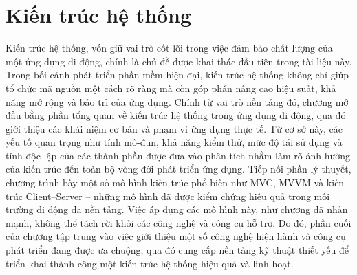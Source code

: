 
\chapter{Kiến trúc hệ thống}
\label{chap:Chap1}
\vspace{-0.8em}
\hspace*{0.8cm}Kiến trúc hệ thống, vốn giữ vai trò cốt lõi trong việc đảm bảo chất lượng của một ứng dụng di động, chính là chủ đề được khai thác đầu tiên trong tài liệu này. Trong bối cảnh phát triển phần mềm hiện đại, kiến trúc hệ thống không chỉ giúp tổ chức mã nguồn một cách rõ ràng mà còn góp phần nâng cao hiệu suất, khả năng mở rộng và bảo trì của ứng dụng. Chính từ vai trò nền tảng đó, chương mở đầu bằng phần tổng quan về kiến trúc hệ thống trong ứng dụng di động, qua đó giới thiệu các khái niệm cơ bản và phạm vi ứng dụng thực tế. Từ cơ sở này, các yếu tố quan trọng như tính mô-đun, khả năng kiểm thử, mức độ tái sử dụng và tính độc lập của các thành phần được đưa vào phân tích nhằm làm rõ ảnh hưởng của kiến trúc đến toàn bộ vòng đời phát triển ứng dụng. Tiếp nối phần lý thuyết, chương trình bày một số mô hình kiến trúc phổ biến như MVC, MVVM và kiến trúc Client–Server – những mô hình đã được kiểm chứng hiệu quả trong môi trường di động đa nền tảng. Việc áp dụng các mô hình này, như chương đã nhấn mạnh, không thể tách rời khỏi các công nghệ và công cụ hỗ trợ. Do đó, phần cuối của chương tập trung vào việc giới thiệu một số công nghệ hiện hành và công cụ phát triển đang được ưa chuộng, qua đó cung cấp nền tảng kỹ thuật thiết yếu để triển khai thành công một kiến trúc hệ thống hiệu quả và linh hoạt.










